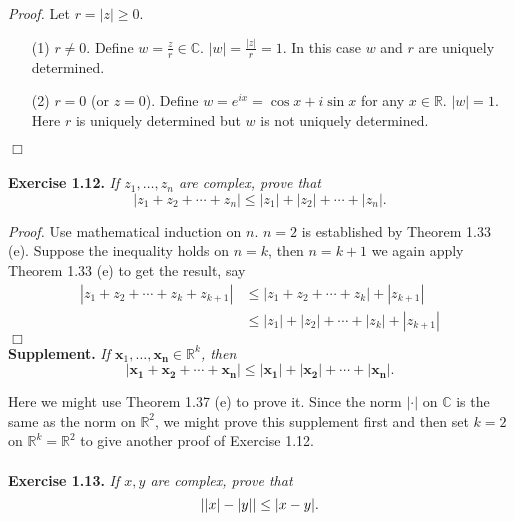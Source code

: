 \documentclass{article}
\begin{document}
\emph{Proof.}
Let $r = |z| \geq 0$.
\begin{enumerate}
\item[(1)]
$r \neq 0$.
Define $w = \frac{z}{r} \in \mathbb{C}$. $|w| = \frac{|z|}{r} = 1$.
In this case $w$ and $r$ are uniquely determined.
\item[(2)]
$r = 0$ (or $z = 0$).
Define $w = e^{ix} = \cos x + i \sin x$ for any $x \in \mathbb{R}$.
$|w| = 1$.
Here $r$ is uniquely determined
but $w$ is not uniquely determined.
\end{enumerate}
$\Box$ \\\\






\textbf{Exercise 1.12.}
\emph{If $z_1, \ldots, z_n$ are complex, prove that
$$|z_1 + z_2 + \cdots + z_n| \leq |z_1| + |z_2| + \cdots + |z_n|.$$}

\emph{Proof.}
Use mathematical induction on $n$. $n = 2$ is established by Theorem 1.33 (e).
Suppose the inequality holds on $n = k$, then $n = k + 1$ we again apply Theorem 1.33 (e)
to get the result, say
\begin{align*}
|z_1 + z_2 + \cdots + z_k + z_{k+1}|
&\leq |z_1 + z_2 + \cdots + z_k| + |z_{k+1}| \\
&\leq |z_1| + |z_2| + \cdots + |z_k| + |z_{k+1}|
\end{align*}
$\Box$ \\

\textbf{Supplement.}
\emph{If $\mathbf{x}_1, \ldots, \mathbf{x_n} \in \mathbb{R}^k$, then
$$|\mathbf{x_1} + \mathbf{x_2} + \cdots + \mathbf{x_n}|
\leq |\mathbf{x_1}| + |\mathbf{x_2}| + \cdots + |\mathbf{x_n}|.$$}

Here we might use Theorem 1.37 (e) to prove it.
Since the norm $|\cdot|$ on $\mathbb{C}$ is the same as the norm on $\mathbb{R}^2$,
we might prove this supplement first
and then set $k = 2$ on $\mathbb{R}^k = \mathbb{R}^2$
to give another proof of Exercise 1.12. \\\\






\textbf{Exercise 1.13.}
\emph{If $x, y$ are complex, prove that
$$\abs{ \abs{x} - \abs{y} } \leq \abs{x-y}.$$}
\end{document}
